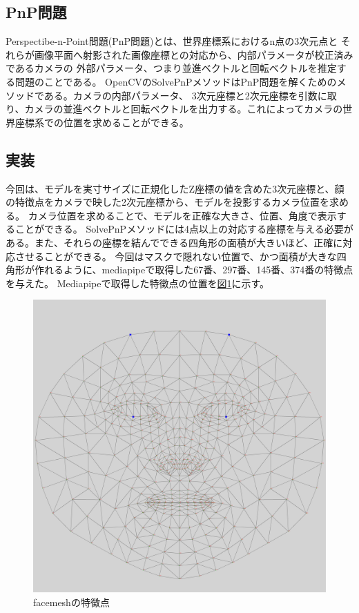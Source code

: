 \documentclass[]{jarticle}          %
\begin{document}
\subsection{PnP問題}
Perspectibe-n-Point問題(PnP問題)とは、世界座標系におけるn点の3次元点と
それらが画像平面へ射影された画像座標との対応から、内部パラメータが校正済みであるカメラの
外部パラメータ、つまり並進ベクトルと回転ベクトルを推定する問題のことである\cite{bib_1}。
OpenCVのSolvePnPメソッドはPnP問題を解くためのメソッドである。カメラの内部パラメータ、
3次元座標と2次元座標を引数に取り、カメラの並進ベクトルと回転ベクトルを出力する。これによってカメラの世界座標系での位置を求めることができる。
\subsection{実装}
今回は、モデルを実寸サイズに正規化したZ座標の値を含めた3次元座標と、顔の特徴点をカメラで映した2次元座標から、モデルを投影するカメラ位置を求める。
カメラ位置を求めることで、モデルを正確な大きさ、位置、角度で表示することができる。
SolvePnPメソッドには4点以上の対応する座標を与える必要がある。また、それらの座標を結んでできる四角形の面積が大きいほど、正確に対応させることができる。
今回はマスクで隠れない位置で、かつ面積が大きな四角形が作れるように、mediapipeで取得した67番、297番、145番、374番の特徴点を与えた。
Mediapipeで取得した特徴点の位置を\hyperref[one]{図\ref{one}}に示す。
\begin{figure}[!ht]
  \begin{center}
    \includegraphics[scale=0.07]{figures/test.png}
    \caption{facemeshの特徴点}
    \label{one}
  \end{center}
\end{figure}
\end{document}
